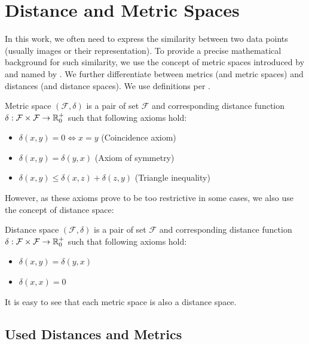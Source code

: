 \section{Distance and Metric Spaces}
\label{sec:distances}

In this work, we often need to express the similarity between two data points (usually images or their representation). To provide a precise mathematical background for such similarity, we use the concept of metric spaces introduced by \cite{metric} and named by \cite{metricname}. We further differentiate between metrics (and metric spaces) and distances (and distance spaces). We use definitions per \cite{deza2009encyclopedia}.

\begin{defn}
Metric space $(\mathcal{F}, \delta)$ is a pair of set $\mathcal{F}$ and
corresponding distance function
$\delta : \mathcal{F} \times \mathcal{F} \rightarrow \mathbb{R}_0^+$ such that
following axioms hold:
\begin{itemize}
    \item $\delta(x, y) = 0 \Leftrightarrow x = y$ (Coincidence axiom)
    \item $\delta(x, y) = \delta(y, x)$ (Axiom of symmetry)
    \item $\delta(x, y) \leq \delta(x, z) + \delta(z, y)$ (Triangle inequality)
\end{itemize}
\end{defn}%

However, as these axioms prove to be too restrictive in some cases, we also use the concept of distance space:
\begin{defn}
Distance space $(\mathcal{F}, \delta)$ is a pair of set $\mathcal{F}$ and
corresponding distance function $\delta : \mathcal{F} \times \mathcal{F} \rightarrow \mathbb{R}_0^+$ such that
following axioms hold:
\begin{itemize}
    \item $\delta(x, y) = \delta(y, x)$
    \item $\delta(x, x) = 0$
\end{itemize}
\end{defn}%
It is easy to see that each metric space is also a distance space.

\subsection{Used Distances and Metrics}

\label{ssec:used_distances}

